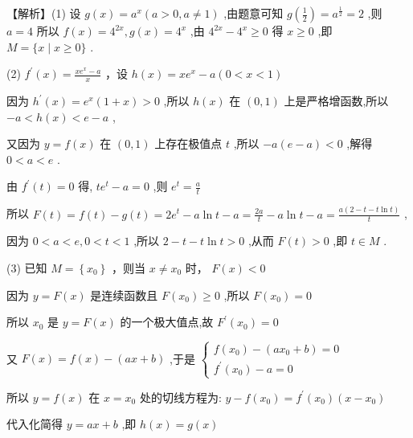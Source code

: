 \documentclass[10pt]{article}
\newcommand*\circled[1]{\tikz[baseline=(char.base)]{\node[shape=circle,draw,inner sep=1.5pt] (char) {\small #1};}}
\begin{document}
【解析】(1) 设 \(g\left( x\right)  = {a}^{x}\left( {a > 0,a \neq  1}\right)\) ,由题意可知 \(g\left( \frac{1}{2}\right)  = {a}^{\frac{1}{2}} = 2\) ,则 \(a = 4\) 所以 \(f\left( x\right)  = {4}^{2x},g\left( x\right)  = {4}^{x}\) ,由 \({4}^{2x} - {4}^{x} \geq  0\) 得 \(x \geq  0\) ,即 \(M = \{ x \mid  x \geq  0\}\) .

(2) \({f}^{\prime }\left( x\right)  = \frac{x{e}^{x} - a}{x}\) ，设 \(h\left( x\right)  = x{e}^{x} - a\left( {0 < x < 1}\right)\)

因为 \({h}^{\prime }\left( x\right)  = {e}^{x}\left( {1 + x}\right)  > 0\) ,所以 \(h\left( x\right)\) 在 \(\left( {0,1}\right)\) 上是严格增函数,所以 \(- a < h\left( x\right)  < e - a\) ,

又因为 \(y = f\left( x\right)\) 在 \(\left( {0,1}\right)\) 上存在极值点 \(t\) ,所以 \(- a\left( {e - a}\right)  < 0\) ,解得 \(0 < a < e\) .

由 \({f}^{\prime }\left( t\right)  = 0\) 得, \(t{e}^{t} - a = 0\) ,则 \({e}^{t} = \frac{a}{t}\)

所以 \(F\left( t\right)  = f\left( t\right)  - g\left( t\right)  = 2{e}^{t} - a\ln t - a = \frac{2a}{t} - a\ln t - a = \frac{a\left( {2 - t - t\ln t}\right) }{t}\) ,

因为 \(0 < a < e,0 < t < 1\) ,所以 \(2 - t - t\ln t > 0\) ,从而 \(F\left( t\right)  > 0\) ,即 \(t \in  M\) .

(3) \circled{1} 已知 \(M = \left\{  {x}_{0}\right\}\) ，则当 \(x \neq  {x}_{0}\) 时， \(F\left( x\right)  < 0\)

因为 \(y = F\left( x\right)\) 是连续函数且 \(F\left( {x}_{0}\right)  \geq  0\) ,所以 \(F\left( {x}_{0}\right)  = 0\)

所以 \({x}_{0}\) 是 \(y = F\left( x\right)\) 的一个极大值点,故 \({F}^{\prime }\left( {x}_{0}\right)  = 0\)

又 \(F\left( x\right)  = f\left( x\right)  - \left( {{ax} + b}\right)\) ,于是 \(\left\{  \begin{array}{l} f\left( {x}_{0}\right)  - \left( {a{x}_{0} + b}\right)  = 0 \\  {f}^{\prime }\left( {x}_{0}\right)  - a = 0 \end{array}\right.\)

所以 \(y = f\left( x\right)\) 在 \(x = {x}_{0}\) 处的切线方程为: \(y - f\left( {x}_{0}\right)  = {f}^{\prime }\left( {x}_{0}\right) \left( {x - {x}_{0}}\right)\)

代入化简得 \(y = {ax} + b\) ,即 \(h\left( x\right)  = g\left( x\right)\)
\end{document}
